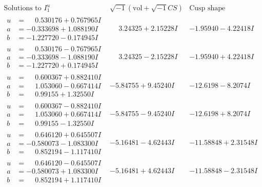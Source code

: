 \documentclass[1p]{elsarticle_modified}
\theoremstyle{definition}
\newcommand{\I}{\sqrt{-1}}
\begin{document}
$$\begin{array}{c|c|c}  
\text{Solutions to }I^u_{1}& \I (\text{vol} + \sqrt{-1}CS) & \text{Cusp shape}\\
 \hline 
\begin{aligned}
u &= \phantom{-}0.530176 + 0.767965 I \\
a &= -0.333698 + 1.088190 I \\
b &= -1.227720 - 0.174945 I\end{aligned}
 & \phantom{-}3.24325 + 2.15228 I & -1.95940 - 4.22418 I \\ \hline\begin{aligned}
u &= \phantom{-}0.530176 - 0.767965 I \\
a &= -0.333698 - 1.088190 I \\
b &= -1.227720 + 0.174945 I\end{aligned}
 & \phantom{-}3.24325 - 2.15228 I & -1.95940 + 4.22418 I \\ \hline\begin{aligned}
u &= \phantom{-}0.600367 + 0.882410 I \\
a &= \phantom{-}1.053060 - 0.667414 I \\
b &= \phantom{-}0.99155 + 1.32550 I\end{aligned}
 & -5.84755 + 9.45240 I & -12.6198 - 8.2074 I \\ \hline\begin{aligned}
u &= \phantom{-}0.600367 - 0.882410 I \\
a &= \phantom{-}1.053060 + 0.667414 I \\
b &= \phantom{-}0.99155 - 1.32550 I\end{aligned}
 & -5.84755 - 9.45240 I & -12.6198 + 8.2074 I \\ \hline\begin{aligned}
u &= \phantom{-}0.646120 + 0.645507 I \\
a &= -0.580073 - 1.083300 I \\
b &= \phantom{-}0.852194 - 1.117410 I\end{aligned}
 & -5.16481 - 4.62443 I & -11.58848 + 2.31548 I \\ \hline\begin{aligned}
u &= \phantom{-}0.646120 - 0.645507 I \\
a &= -0.580073 + 1.083300 I \\
b &= \phantom{-}0.852194 + 1.117410 I\end{aligned}
 & -5.16481 + 4.62443 I & -11.58848 - 2.31548 I \\ \hline\begin{aligned}

\end{aligned}
\end{array}$$
\end{document}
